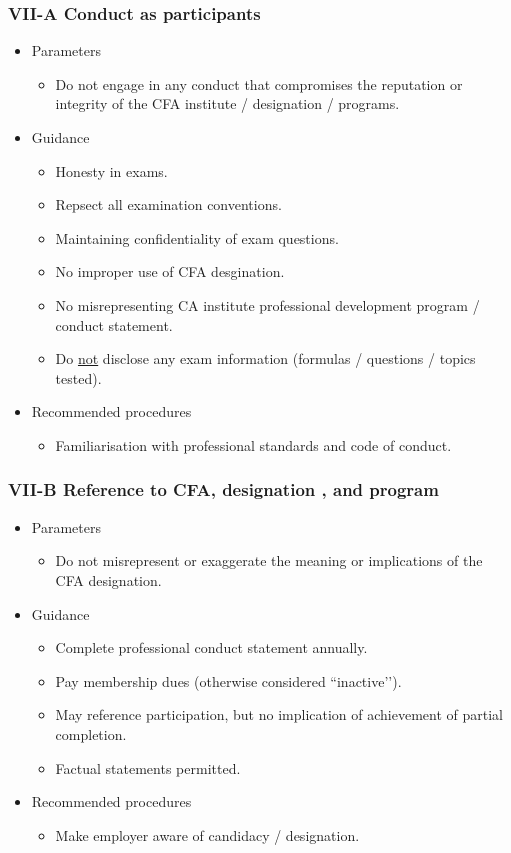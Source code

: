 \documentclass[../notes_compiled.tex]{subfiles}
\begin{document}
\subsubsection{VII-A Conduct as participants}
\begin{itemize}
\item Parameters
\begin{itemize}
\item Do not engage in any conduct that compromises the reputation or integrity of the CFA institute / designation / programs.
\end{itemize}
\item Guidance
\begin{itemize}
\item Honesty in exams.
\item Repsect all examination conventions.
\item Maintaining confidentiality of exam questions.
\item No improper use of CFA desgination.
\item No misrepresenting CA institute professional development program / conduct statement.
\item Do \underline{not} disclose any exam information (formulas / questions / topics tested).
\end{itemize}
\item Recommended procedures
\begin{itemize}
\item Familiarisation with professional standards and code of conduct.
\end{itemize}
\end{itemize}
\subsubsection{VII-B Reference to CFA, designation , and program}
\begin{itemize}
\item Parameters
\begin{itemize}
\item Do not misrepresent or exaggerate the meaning or implications of the CFA designation.
\end{itemize}
\item Guidance
\begin{itemize}
\item Complete professional conduct statement annually.
\item Pay membership dues (otherwise considered ``inactive’’).
\item May reference participation, but no implication of achievement of partial completion.
\item Factual statements permitted.
\end{itemize}
\item Recommended procedures
\begin{itemize}
\item Make employer aware of candidacy / designation.
\end{itemize}
\end{itemize}
\end{document}
